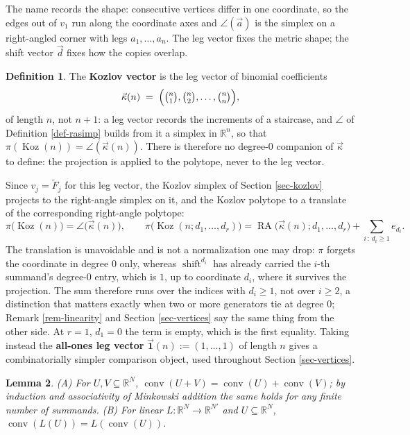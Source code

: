 \documentclass[11pt, a4paper, abstract=yes]{scrartcl}
\theoremstyle{definition}
\newtheorem{definition}{Definition}
\theoremstyle{remark}
\theoremstyle{plain}
\newtheorem{lemma}[definition]{Lemma}
\newcommand{\Koz}{\operatorname{Koz}}
\newcommand{\shift}{\operatorname{shift}}
\newcommand{\rasimp}{\angle}
\newcommand{\RA}{\operatorname{RA}}
\newcommand{\kozvec}{\vec\kappa}
\newcommand{\proj}{\pi}
\newcommand{\onesvec}{\vec{\mathbf 1}}
\newcommand{\conv}{\operatorname{conv}}
\begin{document}
The name records the shape: consecutive vertices differ in one coordinate, so the edges out of
\(v_1\) run along the coordinate axes and \(\rasimp(\vec a)\) is the simplex on a right-angled
corner with legs \(a_1,\dots,a_n\). The leg vector fixes the metric shape; the shift vector
\(\vec d\) fixes how the copies overlap.

\begin{definition}
The \textbf{Kozlov vector} is the leg vector of binomial coefficients
\begin{equation}\label{eq:kozvec}
  \kozvec(n)\;=\;\Bigl(\tbinom n1,\tbinom n2,\dots,\tbinom nn\Bigr),
\end{equation}
of length \(n\), not \(n+1\): a leg vector records the increments of a staircase, and
\(\rasimp\) of Definition \ref{def-rasimp} builds from it a simplex in \(\mathbb R^n\), so that
\(\proj(\Koz(n))=\rasimp(\kozvec(n))\). There is therefore no degree-\(0\) companion of
\(\kozvec\) to define: the projection is applied to the polytope, never to the leg vector.
\label{def:kozvec}
\label{def-kozvec}
\end{definition}

Since \(v_j=\tilde F_j\) for this leg vector, the Kozlov simplex of Section \ref{sec-kozlov} projects
to the right-angle simplex on it, and the Kozlov polytope to a translate of the corresponding
right-angle polytope:
\begin{equation}\label{eq:koz-as-ra}
  \proj\bigl(\Koz(n)\bigr)=\rasimp\bigl(\kozvec(n)\bigr),\qquad
  \proj\bigl(\Koz(n;d_1,\dots,d_r)\bigr)=\RA\bigl(\kozvec(n);d_1,\dots,d_r\bigr)
     +\sum_{i\,:\,d_i\ge1}e_{d_i} .
\end{equation}
The translation is unavoidable and is not a normalization one may drop: \(\proj\) forgets the
coordinate in degree \(0\) only, whereas \(\shift^{d_i}\) has already carried the \(i\)-th summand's
degree-\(0\) entry, which is \(1\), up to coordinate \(d_i\), where it survives the projection.
The sum therefore runs over the indices with \(d_i\ge1\), not over \(i\ge2\), a distinction that
matters exactly when two or more generators tie at degree \(0\); Remark \ref{rem-linearity} and
Section \ref{sec-vertices} say the same thing from the other side. At \(r=1\), \(d_1=0\) the term is
empty, which is the first equality. Taking instead the \textbf{all-ones leg vector}
\(\onesvec(n):=(1,\dots,1)\) of length \(n\) gives a
combinatorially simpler comparison object, used throughout Section \ref{sec-vertices}.

\begin{lemma}
(A) For \(U,V\subseteq\mathbb R^N\), \(\conv(U+V)=\conv(U)+\conv(V)\); by induction and
associativity of Minkowski addition the same holds for any finite number of summands.
(B) For linear \(L:\mathbb R^N\to\mathbb R^{N'}\) and \(U\subseteq\mathbb R^N\),
\(\conv(L(U))=L(\conv(U))\).
\label{lem-convex}
\end{lemma}
\end{document}
